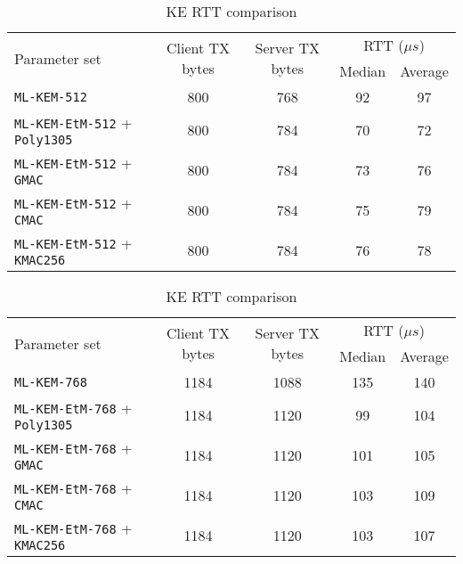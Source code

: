 \documentclass[runningheads]{llncs}
\newcommand{\us}{\mu s}
\begin{document}
\begin{table}[h]
    \centering
    \footnotesize
    \caption{KE RTT comparison}\label{tbl:ke-rtt}

    \begin{tabular}{|p{14em}|c|c|c|c|}
        \hline
        \multirow{2}{*}{Parameter set}
        & \multirow{2}{*}{Client TX bytes}
        & \multirow{2}{*}{Server TX bytes}
        & \multicolumn{2}{|c|}{RTT ($\us$)} \\
        \cline{4-5}
        & & & Median & Average \\
        \hline
        \texttt{ML-KEM-512} & 800 & 768 & 92 & 97 \\
        \hline
        \texttt{ML-KEM-EtM-512} + \texttt{Poly1305} & 800 & 784 & 70 & 72 \\
        \hline
        \texttt{ML-KEM-EtM-512} + \texttt{GMAC} & 800 & 784 & 73 & 76 \\
        \hline
        \texttt{ML-KEM-EtM-512} + \texttt{CMAC} & 800 & 784 & 75 & 79 \\
        \hline
        \texttt{ML-KEM-EtM-512} + \texttt{KMAC256} & 800 & 784 & 76 & 78 \\
        \hline
    \end{tabular}\vspace{0.3cm}
    
    \begin{tabular}{|p{14em}|c|c|c|c|}
        \hline
        \multirow{2}{*}{Parameter set}
        & \multirow{2}{*}{Client TX bytes}
        & \multirow{2}{*}{Server TX bytes}
        & \multicolumn{2}{|c|}{RTT ($\us$)} \\
        \cline{4-5}
        & & & Median & Average \\
        \hline
        \texttt{ML-KEM-768} & 1184 & 1088 & 135 & 140 \\
        \hline
        \texttt{ML-KEM-EtM-768} + \texttt{Poly1305} & 1184 & 1120 & 99 & 104 \\
        \hline
        \texttt{ML-KEM-EtM-768} + \texttt{GMAC} & 1184 & 1120 & 101 & 105 \\
        \hline
        \texttt{ML-KEM-EtM-768} + \texttt{CMAC} & 1184 & 1120 & 103 & 109 \\
        \hline
        \texttt{ML-KEM-EtM-768} + \texttt{KMAC256} & 1184 & 1120 & 103 & 107 \\
        \hline
    \end{tabular}\vspace{0.3cm}


\end{table}
\end{document}
